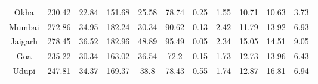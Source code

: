 \documentclass[authoryear,review,12pt]{elsarticle}
\begin{document}
\begin{table}[t]
{\begin{adjustwidth}{-0.8in}{0in}
\begin{tabular}{ccccccllccc}
	Okha                                                                                              & 230.42                    & 22.84                      & 151.68                    & 25.58                   & 78.74                                                                                                                & 0.25                                     & 1.55                                    & 10.71                                           & 10.63                                          & 3.73               \\
	Mumbai                                                                                            & 272.86                    & \multicolumn{1}{c|}{34.95} & 182.24                    & 30.34                   & 90.62                                                                                                                & 0.13                                     & 2.42                                    & 11.79                                           & 13.92                                          & 6.93               \\
	Jaigarh                                                                                           & 278.45                    & 36.52                      & 182.96                    & 48.89                   & 95.49                                                                                                                & 0.05                                     & 2.34                                    & 15.05                                           & 14.51                                          & 9.05               \\
	Goa                                                                                               & 235.22                    & 30.34                      & 163.02                    & 36.54                   & 72.2                                                                                                                 & 0.15                                     & 1.73                                    & 12.73                                           & 13.96                                          & 6.43               \\
	Udupi                                                                                             & 247.81                    & 34.37                      & 169.37                    & 38.8                    & 78.43                                                                                                                & 0.55                                     & 1.74                                    & 12.87                                           & 16.81                                          & 6.94               \\

\end{tabular}
\end{adjustwidth}}
\end{table}
\end{document}
